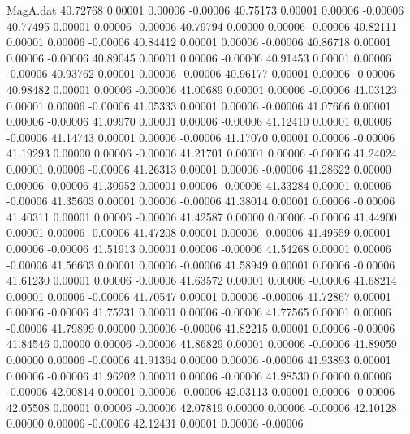 \begin{filecontents}{MagA.dat}
  40.72768    0.00001    0.00006   -0.00006
  40.75173    0.00001    0.00006   -0.00006
  40.77495    0.00001    0.00006   -0.00006
  40.79794    0.00000    0.00006   -0.00006
  40.82111    0.00001    0.00006   -0.00006
  40.84412    0.00001    0.00006   -0.00006
  40.86718    0.00001    0.00006   -0.00006
  40.89045    0.00001    0.00006   -0.00006
  40.91453    0.00001    0.00006   -0.00006
  40.93762    0.00001    0.00006   -0.00006
  40.96177    0.00001    0.00006   -0.00006
  40.98482    0.00001    0.00006   -0.00006
  41.00689    0.00001    0.00006   -0.00006
  41.03123    0.00001    0.00006   -0.00006
  41.05333    0.00001    0.00006   -0.00006
  41.07666    0.00001    0.00006   -0.00006
  41.09970    0.00001    0.00006   -0.00006
  41.12410    0.00001    0.00006   -0.00006
  41.14743    0.00001    0.00006   -0.00006
  41.17070    0.00001    0.00006   -0.00006
  41.19293    0.00000    0.00006   -0.00006
  41.21701    0.00001    0.00006   -0.00006
  41.24024    0.00001    0.00006   -0.00006
  41.26313    0.00001    0.00006   -0.00006
  41.28622    0.00000    0.00006   -0.00006
  41.30952    0.00001    0.00006   -0.00006
  41.33284    0.00001    0.00006   -0.00006
  41.35603    0.00001    0.00006   -0.00006
  41.38014    0.00001    0.00006   -0.00006
  41.40311    0.00001    0.00006   -0.00006
  41.42587    0.00000    0.00006   -0.00006
  41.44900    0.00001    0.00006   -0.00006
  41.47208    0.00001    0.00006   -0.00006
  41.49559    0.00001    0.00006   -0.00006
  41.51913    0.00001    0.00006   -0.00006
  41.54268    0.00001    0.00006   -0.00006
  41.56603    0.00001    0.00006   -0.00006
  41.58949    0.00001    0.00006   -0.00006
  41.61230    0.00001    0.00006   -0.00006
  41.63572    0.00001    0.00006   -0.00006
  41.68214    0.00001    0.00006   -0.00006
  41.70547    0.00001    0.00006   -0.00006
  41.72867    0.00001    0.00006   -0.00006
  41.75231    0.00001    0.00006   -0.00006
  41.77565    0.00001    0.00006   -0.00006
  41.79899    0.00000    0.00006   -0.00006
  41.82215    0.00001    0.00006   -0.00006
  41.84546    0.00000    0.00006   -0.00006
  41.86829    0.00001    0.00006   -0.00006
  41.89059    0.00000    0.00006   -0.00006
  41.91364    0.00000    0.00006   -0.00006
  41.93893    0.00001    0.00006   -0.00006
  41.96202    0.00001    0.00006   -0.00006
  41.98530    0.00000    0.00006   -0.00006
  42.00814    0.00001    0.00006   -0.00006
  42.03113    0.00001    0.00006   -0.00006
  42.05508    0.00001    0.00006   -0.00006
  42.07819    0.00000    0.00006   -0.00006
  42.10128    0.00000    0.00006   -0.00006
  42.12431    0.00001    0.00006   -0.00006

\end{filecontents}
